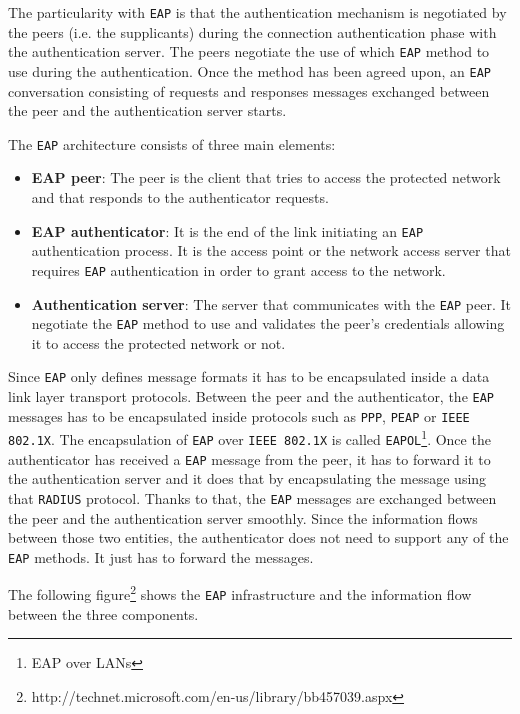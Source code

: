 The particularity with \texttt{EAP} is that the authentication mechanism is negotiated by the peers (i.e. the supplicants) during the connection authentication phase with the authentication server. The peers negotiate the use of which \texttt{EAP} method to use during the authentication. Once the method has been agreed upon, an \texttt{EAP} conversation consisting of requests and responses messages exchanged between the peer and the authentication server starts.

The \texttt{EAP} architecture consists of three main elements:
\begin{itemize}
	\item \textbf{EAP peer}: The peer is the client that tries to access the protected network and that responds to the authenticator requests.
	\item \textbf{EAP authenticator}: It is the end of the link initiating an \texttt{EAP} authentication process. It is the access point or the network access server that requires \texttt{EAP} authentication in order to grant access to the network.
	\item \textbf{Authentication server}: The server that communicates with the \texttt{EAP} peer. It negotiate the \texttt{EAP} method to use and validates the peer's credentials allowing it to access the protected network or not.
\end{itemize}

Since \texttt{EAP} only defines message formats it has to be encapsulated inside a data link layer transport protocols. Between the peer and the authenticator, the \texttt{EAP} messages has to be encapsulated inside protocols such as \texttt{PPP}, \texttt{PEAP} or \texttt{IEEE 802.1X}. The encapsulation of \texttt{EAP} over \texttt{IEEE 802.1X} is called \texttt{EAPOL}\footnote{EAP over LANs}. Once the authenticator has received a \texttt{EAP} message from the peer, it has to forward it to the authentication server and it does that by encapsulating the message using that \texttt{RADIUS} protocol. Thanks to that, the \texttt{EAP} messages are exchanged between the peer and the authentication server smoothly. Since the information flows between those two entities, the authenticator does not need to support any of the \texttt{EAP} methods. It just has to forward the messages.

The following figure\footnote{http://technet.microsoft.com/en-us/library/bb457039.aspx} shows the \texttt{EAP} infrastructure and the information flow between the three components.

